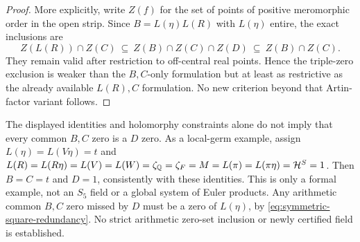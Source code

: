\begin{proof}
More explicitly, write $Z(f)$ for the set of points of positive meromorphic order in the open strip. Since $B=L(\eta)L(R)$ with $L(\eta)$ entire, the exact inclusions are
\[
Z(L(R))\cap Z(C)
\ \subseteq\ Z(B)\cap Z(C)\cap Z(D)
\ \subseteq\ Z(B)\cap Z(C).
\]
They remain valid after restriction to off-central real points. Hence the triple-zero exclusion is weaker than the $B,C$-only formulation but at least as restrictive as the already available $L(R),C$ formulation. No new criterion beyond that Artin-factor variant follows.
\end{proof}

\begin{remark}
The displayed identities and holomorphy constraints alone do not imply that every common $B,C$ zero is a $D$ zero. As a local-germ example, assign $L(\eta)=L(V\eta)=t$ and $L(R)=L(R\eta)=L(V)=L(W)=\zeta_{\mathbb Q}=\zeta_F=M=L(\pi)=L(\pi\eta)=\mathcal H^S=1$. Then $B=C=t$ and $D=1$, consistently with these identities. This is only a formal example, not an $S_5$ field or a global system of Euler products. Any arithmetic common $B,C$ zero missed by $D$ must be a zero of $L(\eta)$, by \eqref{eq:symmetric-square-redundancy}. No strict arithmetic zero-set inclusion or newly certified field is established.
\end{remark}
